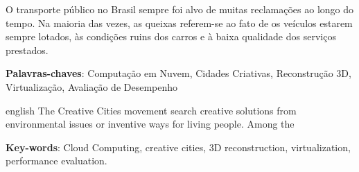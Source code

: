 \begin{resumo}

O transporte público no Brasil sempre foi alvo de muitas reclamações ao longo do tempo. Na maioria das vezes, as queixas referem-se ao fato de os veículos estarem sempre lotados, às condições ruins dos carros e à baixa qualidade dos serviços prestados.

 \vspace{\onelineskip}
    
 \noindent
 \textbf{Palavras-chaves}: Computação em Nuvem, Cidades Criativas, Reconstrução 3D, Virtualiza\-ção, Avaliação de Desempenho
\end{resumo}





\begin{resumo}[Abstract]
 \begin{otherlanguage*}{english}
   The Creative Cities movement search creative solutions from environmental issues or inventive ways for living people. Among the 
    
   \vspace{\onelineskip}
 
   \noindent 
   \textbf{Key-words}: Cloud Computing, creative cities, 3D reconstruction, virtualization, performance evaluation.
 \end{otherlanguage*}
\end{resumo}

\begin{comment}




\begin{resumo}[Résumé]
 \begin{otherlanguage*}{french}
    Il s'agit d'un résumé en français.
 
   \vspace{\onelineskip}
 
   \noindent
   \textbf{Mots-clés}: latex. abntex. publication de textes.
 \end{otherlanguage*}
\end{resumo}




\begin{resumo}[Resumen]
 \begin{otherlanguage*}{spanish}
   Este es el resumen en español.
  
   \vspace{\onelineskip}
 
   \noindent
   \textbf{Palabras clave}: latex. abntex. publicación de textos.
 \end{otherlanguage*}
\end{resumo}

\end{comment}